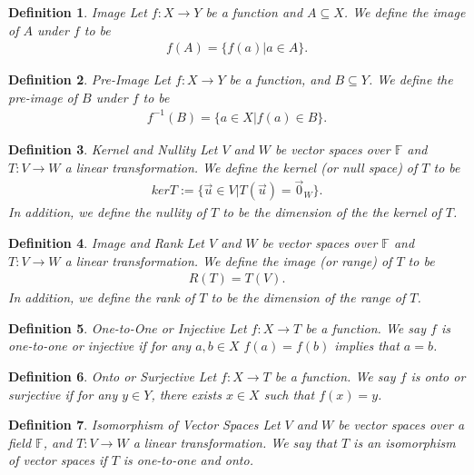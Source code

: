 \documentclass[12pt,answers]{exam}
\newcommand{\F}{\mathbb{F}}
\newtheorem{definition}{Definition}[section]
\begin{document}
\begin{definition}{Image}
Let $f:X\rightarrow Y$ be a function and $A\subseteq X$. We define the image of $A$ under $f$ to be
\begin{align*}
	f(A)=\{f(a)|a\in A\}.
\end{align*}
\end{definition}

\begin{definition}{Pre-Image}
Let $f:X\rightarrow Y$ be a function, and $B\subseteq Y$. We define the pre-image of $B$ under $f$ to be
\begin{align*}
	f^{-1}(B)=\{a\in X|f(a)\in B\}.
\end{align*}
\end{definition}

\begin{definition}{Kernel and Nullity}
Let $V$ and $W$ be vector spaces over $\F$ and $T:V\rightarrow W$ a linear transformation. We define the kernel (or null space) of $T$ to be
\begin{align*}
	kerT:=\{\vec{u}\in V|T(\vec{u})=\vec{0}_W\}.
\end{align*}
In addition, we define the nullity of $T$ to be the dimension of the the kernel of $T$. 
\end{definition}

\begin{definition}{Image and Rank}
Let $V$ and $W$ be vector spaces over $\F$ and $T:V\rightarrow W$ a linear transformation. We define the image (or range) of $T$ to be
\begin{align*}
	R(T)=T(V).
\end{align*}
In addition, we define the rank of $T$ to be the dimension of the range of $T$. 
\end{definition}

\begin{definition}{One-to-One or Injective}
Let $f:X\rightarrow T$ be a function. We say $f$ is one-to-one or injective if for any $a,b\in X$ $f(a)=f(b)$ implies that $a=b$.
\end{definition}

\begin{definition}{Onto or Surjective}
Let $f:X\rightarrow T$ be a function. We say $f$ is onto or surjective if for any $y\in Y$, there exists $x\in X$ such that $f(x)=y$.
\end{definition}

\begin{definition}{Isomorphism of Vector Spaces}
Let $V$ and $W$ be vector spaces over a field $\F$, and $T:V\rightarrow W$ a linear transformation. We say that $T$ is an isomorphism of vector spaces if $T$ is one-to-one and onto.
\end{definition}
\end{document}
